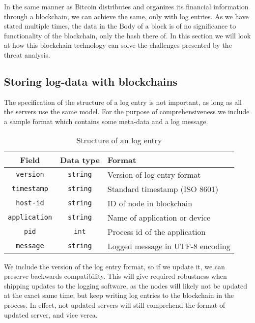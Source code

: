 
In the same manner as Bitcoin distributes and organizes its financial
information through a blockchain, we can achieve the same, only with
log entries. As we have stated multiple times, the data in the Body of
a block is of no significance to functionality of the blockchain, only
the hash there of. In this section we will look at how this blockchain
technology can solve the challenges presented by the threat analysis.


\subsection{Storing log-data with blockchains}
The specification of the structure of a log entry is not important, as
long as all the servers use the same model. For the purpose of
comprehensiveness we include a sample format which contains some
meta-data and a log message.
\begin{table}[H]
  \centering
  \begin{tabular}{c|c|l}
    Field                & Data type       & Format                                    \\ \hline
    \texttt{version}     & \texttt{string} & Version of log entry format               \\
    \texttt{timestamp}   & \texttt{string} & Standard timestamp (ISO 8601)             \\
    \texttt{host-id}     & \texttt{string} & ID of node in blockchain                  \\
    \texttt{application} & \texttt{string} & Name of application or device             \\
    \texttt{pid}         & \texttt{int}    & Process id of the application             \\
    \texttt{message}     & \texttt{string} & Logged message in UTF-8 encoding
  \end{tabular}
  \caption{\label{tab:log-entry} Structure of an log entry}
\end{table}
We include the version of the log entry format, so if we update it, we
can preserve backwards compatibility. This will give required
robustness when shipping updates to the logging software, as the nodes
will likely not be updated at the exact same time, but keep writing
log entries to the blockchain in the process. In effect, not updated
servers will still comprehend the format of updated server, and vice
verca.

